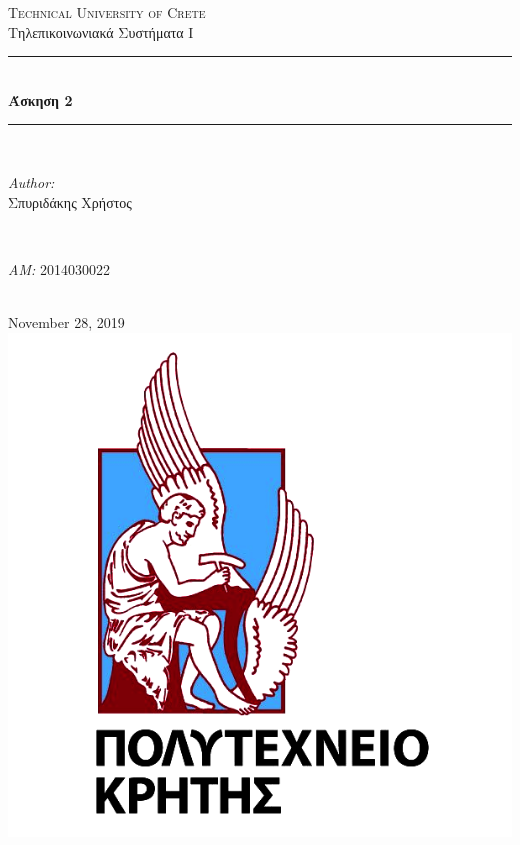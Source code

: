 \documentclass[11pt]{article}
\begin{document}
    \begin{titlepage}
        \center
        \textsc{\LARGE Technical University of Crete}\\[2cm] 
        \Large Τηλεπικοινωνιακά Συστήματα Ι\\[1cm] 
        
        \rule{\linewidth}{0.5mm} \\[0.5cm]
            { \huge \bfseries Άσκηση 2}\\[0.5cm]
        \rule{\linewidth}{0.5mm} \\[2.5cm]
        
        \begin{minipage}{0.4\textwidth}
            \begin{flushleft} \large
                \emph{Author:}\\
                    Σπυριδάκης Χρήστος
            \end{flushleft}
        \end{minipage}
        ~
        \begin{minipage}{0.4\textwidth}
            \begin{flushright} \large
                \emph{ΑΜ:} 2014030022
            \end{flushright}
        \end{minipage}\\[4cm]
        
        {\large November 28, 2019}\\[2cm] 
        \includegraphics[scale=0.5]{TUC.png} 
        \vfill
    \end{titlepage}
\end{document}

